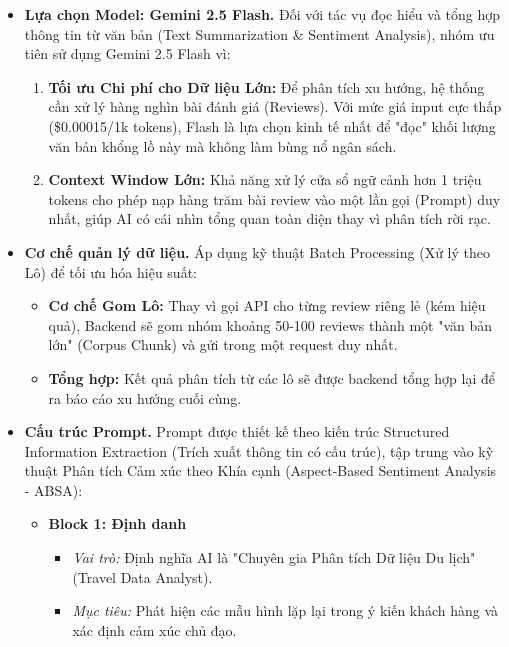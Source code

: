 \begin{itemize} 
    \item \textbf{Lựa chọn Model: Gemini 2.5 Flash.} Đối với tác vụ đọc hiểu và tổng hợp thông tin từ văn bản (Text Summarization \& Sentiment Analysis), nhóm ưu tiên sử dụng Gemini 2.5 Flash vì:
    \begin{enumerate}[label=\arabic*., leftmargin=*]
        \item \textbf{Tối ưu Chi phí cho Dữ liệu Lớn:} Để phân tích xu hướng, hệ thống cần xử lý hàng nghìn bài đánh giá (Reviews). Với mức giá input cực thấp (\$0.00015/1k tokens), Flash là lựa chọn kinh tế nhất để "đọc" khối lượng văn bản khổng lồ này mà không làm bùng nổ ngân sách.
        
        \item \textbf{Context Window Lớn:} Khả năng xử lý cửa sổ ngữ cảnh hơn 1 triệu tokens cho phép nạp hàng trăm bài review vào một lần gọi (Prompt) duy nhất, giúp AI có cái nhìn tổng quan toàn diện thay vì phân tích rời rạc.
    \end{enumerate}

    \item \textbf{Cơ chế quản lý dữ liệu.} Áp dụng kỹ thuật Batch Processing (Xử lý theo Lô) để tối ưu hóa hiệu suất:
    \begin{itemize}
        \item \textbf{Cơ chế Gom Lô:} Thay vì gọi API cho từng review riêng lẻ (kém hiệu quả), Backend sẽ gom nhóm khoảng 50-100 reviews thành một "văn bản lớn" (Corpus Chunk) và gửi trong một request duy nhất.
        \item \textbf{Tổng hợp:} Kết quả phân tích từ các lô sẽ được backend tổng hợp lại để ra báo cáo xu hướng cuối cùng.
    \end{itemize}

    \item \textbf{Cấu trúc Prompt.} Prompt được thiết kế theo kiến trúc Structured Information Extraction (Trích xuất thông tin có cấu trúc), tập trung vào kỹ thuật Phân tích Cảm xúc theo Khía cạnh (Aspect-Based Sentiment Analysis - ABSA):
    \begin{itemize}
        \item \textbf{Block 1: Định danh}
        \begin{itemize}
            \item \textit{Vai trò:} Định nghĩa AI là "Chuyên gia Phân tích Dữ liệu Du lịch" (Travel Data Analyst).
            \item \textit{Mục tiêu:} Phát hiện các mẫu hình lặp lại trong ý kiến khách hàng và xác định cảm xúc chủ đạo.
        \end{itemize}
        

\end{itemize}
\end{itemize}
